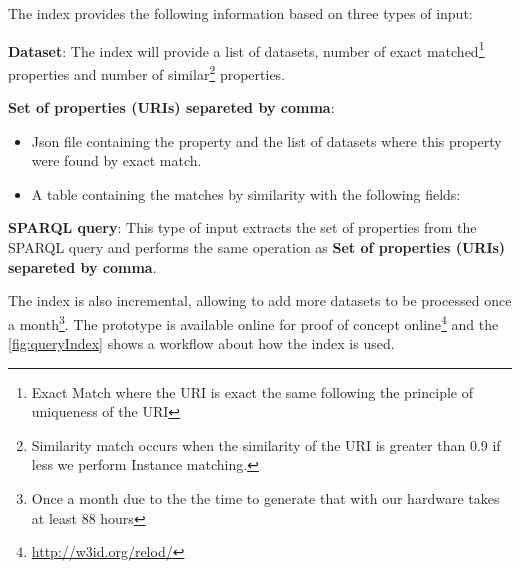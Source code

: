 \documentclass[sw]{iosart2x}
\begin{document}
The index provides the following information based on three types of input:
\begin{description}
    \item \textbf{Dataset}: The index will provide a list of datasets, number of exact matched\footnote{Exact Match where the URI is exact the same following the principle of uniqueness of the URI} properties and number of similar\footnote{Similarity match occurs when the similarity of the URI is greater than 0.9 if less we perform Instance matching.} properties.
    \item \textbf{Set of properties (URIs) separeted by comma}: 
    \begin{itemize}
        \item Json file containing the property and the list of datasets where this property were found by exact match.
        \item A table containing the matches by similarity with the following fields:
    \end{itemize}
    \item \textbf{SPARQL query}: This type of input extracts the set of properties from the SPARQL query and performs the same operation as \textbf{Set of properties (URIs) separeted by comma}.
\end{description}

The index is also incremental, allowing to add more datasets to be processed once a month\footnote{Once a month due to the the time to generate that with our hardware takes at least 88 hours}.
The prototype is available online for proof of concept online\footnote{\url{http://w3id.org/relod/}} and the \cref{fig:queryIndex} shows a workflow about how the index is used.



\end{document}
